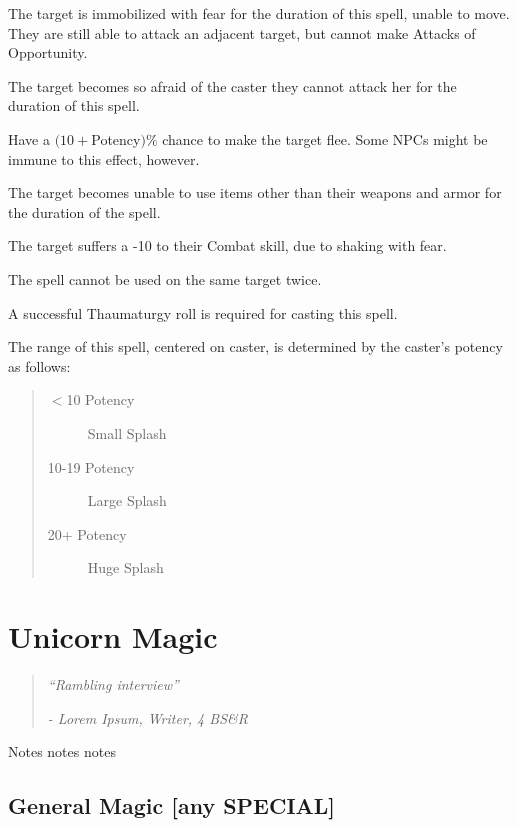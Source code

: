 \documentclass[11pt,a4paper,twocolumn]{book}
\begin{document}
\begin{compactitem}
	\item The target is immobilized with fear for the duration of this spell, unable to move. They are still able to attack an adjacent target, but cannot make Attacks of Opportunity.
	\item The target becomes so afraid of the caster they cannot attack her for the duration of this spell.
	\item Have a $(10 + $Potency$)\%$ chance to make the target flee. Some NPCs might be immune to this effect, however.
	\item The target becomes unable to use items other than their weapons and armor for the duration of the spell.
	\item The target suffers a -10 to their Combat skill, due to shaking with fear.
\end{compactitem}
\smallskip{}

The spell cannot be used on the same target twice.

A successful Thaumaturgy roll is required for casting this spell.

The range of this spell, centered on caster, is determined by the caster's potency as follows:
\begin{quote}
	\begin{description}
		\item[$<$10 Potency] 	Small Splash
		\item[10-19 Potency] 	Large Splash
		\item[20+ Potency] 	Huge Splash
	\end{description}	
\end{quote}   

\chapter{Unicorn Magic}
\begin{quote}
	\emph{``Rambling interview''}
	
	\emph{- Lorem Ipsum, Writer, 4 BS\&R}
\end{quote}

Notes notes notes

\vfill

\section*{General Magic [any SPECIAL]}
\end{document}
